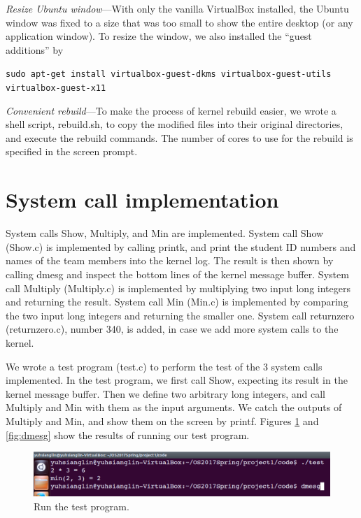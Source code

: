\documentclass[twoside, 11pt, tablecaption=bottom]{article}
\begin{document}
	\emph{Resize Ubuntu window}---With only the vanilla VirtualBox installed, the Ubuntu window was fixed to a size that was too small to show the entire desktop (or any application window). To resize the window, we also installed the ``guest additions'' by
	
		\texttt{sudo apt-get install virtualbox-guest-dkms virtualbox-guest-utils virtualbox-guest-x11}
	
	\emph{Convenient rebuild}---To make the process of kernel rebuild easier, we wrote a shell script, rebuild.sh, to copy the modified files into their original directories, and execute the rebuild commands. The number of cores to use for the rebuild is specified in the screen prompt.




\section{System call implementation}

	System calls Show, Multiply, and Min are implemented. System call Show (Show.c) is implemented by calling printk, and print the student ID numbers and names of the team members into the kernel log. The result is then shown by calling dmesg and inspect the bottom lines of the kernel message buffer. System call Multiply (Multiply.c) is implemented by multiplying two input long integers and returning the result. System call Min (Min.c) is implemented by comparing the two input long integers and returning the smaller one. System call returnzero (returnzero.c), number 340, is added, in case we add more system calls to the kernel.
	
	We wrote a test program (test.c) to perform the test of the 3 system calls implemented. In the test program, we first call Show, expecting its result in the kernel message buffer. Then we define two arbitrary long integers, and call Multiply and Min with them as the input arguments. We catch the outputs of Multiply and Min, and show them on the screen by printf. Figures \ref{fig:test} and \ref{fig:dmesg} show the results of running our test program.


\begin{figure}
\centering
\includegraphics[width = 15 cm]{test}
\caption{Run the test program.}
\label{fig:test}
\end{figure}
\end{document}
